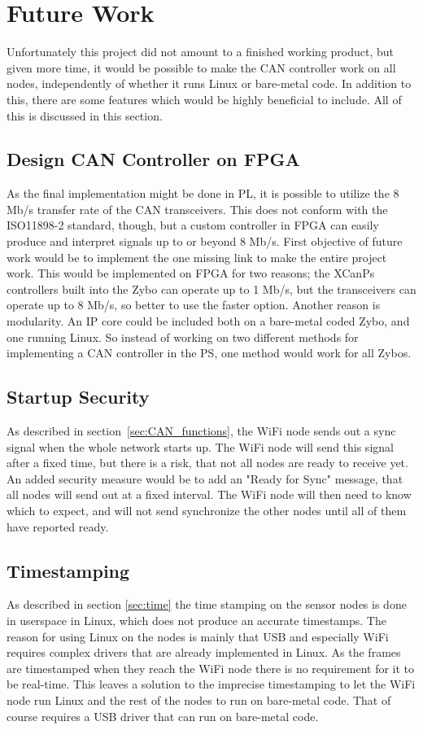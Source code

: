 
\section{Future Work}\label{sec:future_work}
Unfortunately this project did not amount to a finished working product, but given more time, it would be possible to make the CAN controller work on all nodes, independently of whether it runs Linux or bare-metal code.
In addition to this, there are some features which would be  highly beneficial to include.
All of this is discussed in this section.

\subsection*{Design CAN Controller on FPGA}
As the final implementation might be done in PL, it is possible to utilize the 8 Mb/s transfer rate of the CAN transceivers.
This does not conform with the ISO11898-2 standard, though, but a custom controller in FPGA can easily produce and interpret signals up to or beyond 8 Mb/s.
First objective of future work would be to implement the one missing link to make the entire project work.
This would be implemented on FPGA for two reasons;
the XCanPs controllers built into the Zybo can operate up to 1 Mb/s, but the transceivers can operate up to 8 Mb/s, so better to use the faster option.
Another reason is modularity.
An IP core could be included both on a bare-metal coded Zybo, and one running Linux.
So instead of working on two different methods for implementing a CAN controller in the PS, one method would work for all Zybos.

\subsection*{Startup Security}
As described in section~\ref{sec:CAN_functions}, the WiFi node sends out a sync signal when the whole network starts up.
The WiFi node will send this signal after a fixed time, but there is a risk, that not all nodes are ready to receive yet. 
An added security measure would be to add an "Ready for Sync" message, that all nodes will send out at a fixed interval.
The WiFi node will then need to know which to expect, and will not send synchronize the other nodes until all of them have reported ready.

\subsection*{Timestamping}
As described in section \ref{sec:time} the time stamping on the sensor nodes is done in userspace in Linux, which does not produce an  accurate timestamps.
The reason for using Linux on the nodes is mainly that USB and especially WiFi requires complex drivers that are already implemented in Linux.
As the frames are timestamped when they reach the WiFi node there is no requirement for it to be real-time.
This leaves a solution to the imprecise timestamping to let the WiFi node run Linux and the rest of the nodes to run on bare-metal code.
That of course requires a USB driver that can run on bare-metal code.

